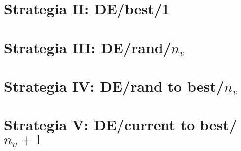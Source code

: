 
\section{Strategia II: DE/best/1}\label{sec:kompilacja}


\section{Strategia III: DE/rand/$n_{v}$}\label{sec:narzedzia}


\section{Strategia IV: DE/rand to best/$n_{v}$}\label{sec:narzedzia}


\section{Strategia V: DE/current to best/$n_{v} +1$}\label{sec:narzedzia}